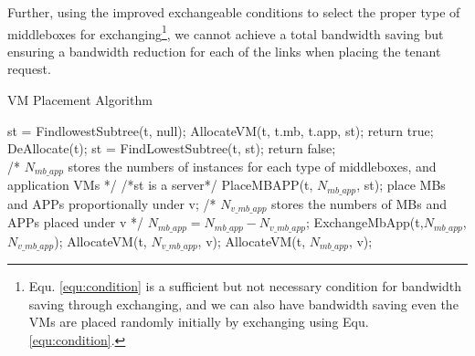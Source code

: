 \documentclass[review]{elsarticle}
\begin{document}
Further, using the improved exchangeable conditions to select the proper type of middleboxes for exchanging\footnote{Equ. \ref{equ:condition} is a sufficient but not necessary condition for bandwidth saving through exchanging, and we can also have bandwidth saving even the VMs are placed randomly initially by exchanging using Equ. \ref{equ:condition}.},
we cannot achieve a total bandwidth saving but ensuring a bandwidth reduction for each of the links when placing the tenant request.

\begin{algorithm}[!htbp]
	\caption{VM Placement Algorithm}
	\label{alg1}
	\begin{algorithmic}[1]
		\State st = FindlowestSubtree(t, null);
		\State AllocateVM(t, t.mb, t.app, st);
		\State return true;
		\EndIf 
		\State DeAllocate(t);
		\State st = FindLowestSubtree(t, st);
		\EndWhile
		\State return false;
		\EndFunction
		\\
		/* $N_{mb\_app}$ stores the numbers of instances for 
		\State each type of middleboxes, and application VMs */
		 /*st is a server*/
		\State PlaceMBAPP(t, $N_{mb\_app}$, st);
		\Else
		\State place
		MBs and APPs \State proportionally under v;
		\State /* $N_{v\_mb\_app}$ stores the numbers of 
		\State MBs and APPs placed under v */
		\State $N_{mb\_app} = N_{mb\_app} - N_{v\_mb\_app}$;
		\State ExchangeMbApp(t,$N_{mb\_app}$,$N_{v\_mb\_app}$);
		\State AllocateVM(t, $N_{v\_mb\_app}$, v);
		\Else
		\State AllocateVM(t, $N_{mb\_app}$, v);
		\EndIf
		\EndIf
		\EndFor
		\EndIf
		\EndFunction %
	\end{algorithmic}
\end{algorithm}
\end{document}
